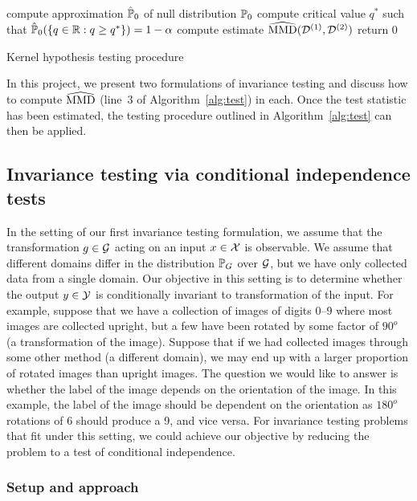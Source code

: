 \begin{algorithm}[H]
\SetAlgoLined
{}
\BlankLine
compute approximation $\hat{\P}_0$ of null distribution $\P_0$\;
compute critical value $q^*$ such that $\hat{\P}_0(\{q\in\bbR:q\geq q^*\})=1-\alpha$\;
compute estimate $\hatMMD(\calD^{(1)},\calD^{(2)})$\;
return 0\;
\caption{Kernel hypothesis testing procedure}
\label{alg:test}
\end{algorithm}
\vspace{1em}

In this project, we present two formulations of invariance testing and discuss how to compute $\hatMMD$ (line~3 of Algorithm~\ref{alg:test}) in each. Once the test statistic has been estimated, the testing procedure outlined in Algorithm~\ref{alg:test} can then be applied.


\subsection{Invariance testing via conditional independence tests} \label{sec:condind}

In the setting of our first invariance testing formulation, we assume that the transformation $g\in\calG$ acting on an input $x\in\calX$ is observable. We assume that different domains differ in the distribution $\P_G$ over $\calG$, but we have only collected data from a single domain. Our objective in this setting is to determine whether the output $y\in\calY$ is conditionally invariant to transformation of the input. For example, suppose that we have a collection of images of digits 0--9 where most images are collected upright, but a few have been rotated by some factor of $90^o$ (a transformation of the image). Suppose that if we had collected images through some other method (a different domain), we may end up with a larger proportion of rotated images than upright images. The question we would like to answer is whether the label of the image depends on the orientation of the image. In this example, the label of the image should be dependent on the orientation as $180^o$ rotations of 6 should produce a 9, and vice versa. For invariance testing problems that fit under this setting, we could achieve our objective by reducing the problem to a test of  conditional independence.

\subsubsection{Setup and approach}

